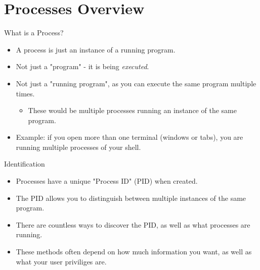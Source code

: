 %
\section{Processes Overview}
\label{sec:processes_overview}

\begin{frame}[fragile]{What is a Process?}
  \begin{itemize}[<+- | alert@+>]
    \item A process is just an instance of a running program.
    \item Not just a "program" \-- it is being \emph{executed}.
    \item Not just a "running program", as you can execute the same program multiple times.
    \begin{itemize}[<+- | alert@+>]
      \item These would be multiple processes running an instance of the same program.
    \end{itemize}
    \item Example: if you open more than one terminal (windows or tabs), you are running multiple processes
          of your shell.
  \end{itemize}
\end{frame}

\begin{frame}[fragile]{Identification}
  \begin{itemize}[<+- | alert@+>]
    \item Processes have a unique "Process ID" (PID) when created.
    \item The PID allows you to distinguish between multiple instances of the same program.
    \item There are countless ways to discover the PID, as well as what processes are running.
    \item These methods often depend on how much information you want, as well as what your user priviliges are.
  \end{itemize}
\end{frame}


